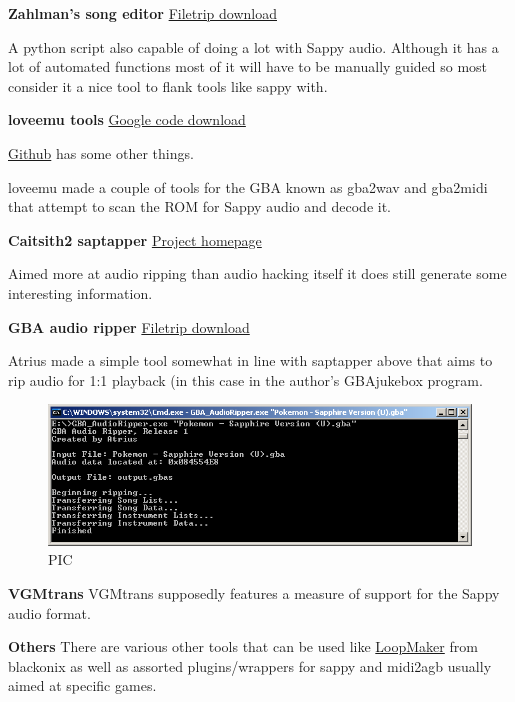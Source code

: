 \documentclass[
]{book}
\begin{document}
\textbf{Zahlman's song editor} \href{http://filetrip.net/gba-downloads/tools-utilities/latest-zahlman039s-song-editor-f29864.html}{Filetrip download}

A python script also capable of doing a lot with Sappy audio. Although it has a lot of automated functions most of it will have to be manually guided so most consider it a nice tool to flank tools like sappy with.

\textbf{loveemu tools} \href{https://code.google.com/p/loveemu/downloads/list?can=1\&q=\&colspec=Filename+Summary+Uploaded+ReleaseDate+Size+DownloadCount}{Google code download}

\href{https://github.com/loveemu}{Github} has some other things.

loveemu made a couple of tools for the GBA known as gba2wav and gba2midi that attempt to scan the ROM for Sappy audio and decode it.

\textbf{Caitsith2 saptapper} \href{http://gsf.caitsith2.net/ripping.html}{Project homepage}

Aimed more at audio ripping than audio hacking itself it does still generate some interesting information.

\textbf{GBA audio ripper} \href{http://filetrip.net/gba-downloads/tools-utilities/latest-gba-audio-ripper-f29863.html}{Filetrip download}

Atrius made a simple tool somewhat in line with saptapper above that aims to rip audio for 1:1 playback (in this case in the author's GBAjukebox program.

\begin{figure}
\centering
\includegraphics{images/166_home_fast6191_romhackingguide_unrenamed_fil___rs_romhackingguideGBAaudio_GBAaudioripper_1.png}
\caption{PIC}
\end{figure}

\textbf{VGMtrans} VGMtrans supposedly features a measure of support for the Sappy audio format.

\textbf{Others} There are various other tools that can be used like \href{http://www42.atwiki.jp/_pub/blackonix/Tools/}{LoopMaker} from blackonix as well as assorted plugins/wrappers for sappy and midi2agb usually aimed at specific games.
\end{document}
